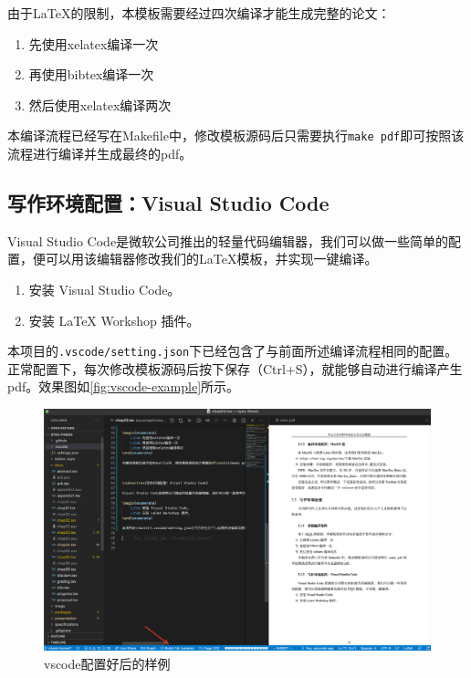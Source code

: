 由于\LaTeX 的限制，本模板需要经过四次编译才能生成完整的论文：

\begin{enumerate}
	\item 先使用xelatex编译一次
	\item 再使用bibtex编译一次
	\item 然后使用xelatex编译两次
\end{enumerate}

本编译流程已经写在Makefile中，修改模板源码后只需要执行\texttt{make pdf}即可按照该流程进行编译并生成最终的pdf。



\subsection{写作环境配置：Visual Studio Code}

Visual Studio Code是微软公司推出的轻量代码编辑器，我们可以做一些简单的配置，便可以用该编辑器修改我们的\LaTeX 模板，并实现一键编译。

\begin{enumerate}
	\item 安装 Visual Studio Code。
	\item 安装 LaTeX Workshop 插件。
\end{enumerate}

本项目的\texttt{.vscode/setting.json}下已经包含了与前面所述编译流程相同的配置。正常配置下，每次修改模板源码后按下保存（Ctrl+S），就能够自动进行编译产生pdf。效果图如\autoref{fig:vscode-example}所示。


\begin{figure}[h]
	\centering
	\includegraphics[width=\linewidth]{image/chap03/vscode-example.png}
	\caption{vscode配置好后的样例}
	\label{fig:vscode-example}
\end{figure}


